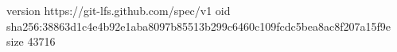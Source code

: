 version https://git-lfs.github.com/spec/v1
oid sha256:38863d1c4e4b92e1aba8097b85513b299c6460c109fcdc5bea8ac8f207a15f9e
size 43716
